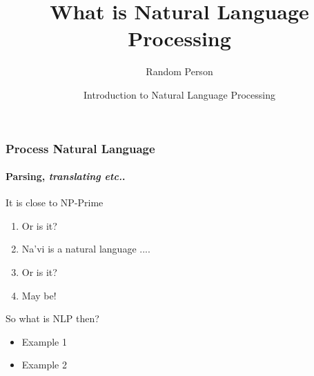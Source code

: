 \documentclass{beamer}
\title{\huge{What is Natural Language Processing}}
\date[Intro '14]{Introduction to Natural Language Processing}
\author[Random]{Random Person}
\begin{document}
\begin{frame}
\titlepage
\end{frame}

\begin{frame} 
\frametitle{Process Natural Language} 
\framesubtitle{ Parsing, \textit{translating etc.}.} 
\begin{theorem}
It is close to NP-Prime \end{theorem} 
\begin{enumerate} 
\item<1-| alert@1> Or is it? 
\item<2-> Na'vi is a natural language ....  
\item<3-> Or is it?  
\item<1-> May be!
\end{enumerate}
\end{frame}

\begin{frame}{So what is NLP then? }
\begin{itemize}
\item Example 1
\item Example 2 
\end{itemize}
\end{frame}
\end{document}
